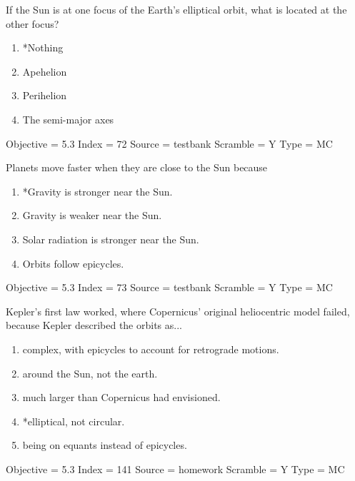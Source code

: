 \documentclass[11pt]{article}
\begin{document}
\begin{enumerate}
\begin{minipage}{\textwidth}
\begin{minipage}{\textwidth}
\item If the Sun is at one focus of the Earth’s elliptical orbit, what is located at the other focus?
\begin{multicols}{3}
\begin{enumerate} 
\setlength{\itemsep}{1pt} 
\setlength{\parskip}{0pt} 
\setlength{\parsep}{0pt}
\setlength{\multicolsep}{1pt} 
\item *Nothing
\item Apehelion
\item Perihelion
\item The semi-major axes
\end{enumerate} 
\vfill 
\end{multicols}

Objective = 5.3
Index = 72
Source = testbank
Scramble = Y
Type = MC
\end{minipage}
\end{minipage}
\vskip 0.20in

\begin{minipage}{\textwidth}
\begin{minipage}{\textwidth}
\item Planets move faster when they are close to the Sun because
\begin{enumerate} 
\setlength{\itemsep}{1pt} 
\setlength{\parskip}{0pt} 
\setlength{\parsep}{0pt}
\setlength{\multicolsep}{1pt} 
\item *Gravity is stronger near the Sun.
\item Gravity is weaker near the Sun.
\item Solar radiation is stronger near the Sun.
\item Orbits follow epicycles.
\end{enumerate} 
Objective = 5.3
Index = 73
Source = testbank
Scramble = Y
Type = MC
\end{minipage}
\end{minipage}
\vskip 0.20in

\begin{minipage}{\textwidth}
\begin{minipage}{\textwidth}
\item Kepler's first law worked, where Copernicus' original heliocentric model failed, because Kepler described the orbits as...
\begin{enumerate} 
\setlength{\itemsep}{1pt} 
\setlength{\parskip}{0pt} 
\setlength{\parsep}{0pt}
\setlength{\multicolsep}{1pt} 
\item complex, with epicycles to account for retrograde motions.
\item around the Sun, not the earth.
\item much larger than Copernicus had envisioned.
\item *elliptical, not circular.
\item being on equants instead of epicycles.
\end{enumerate} 
Objective = 5.3
Index = 141
Source = homework
Scramble = Y
Type = MC
\end{minipage}
\end{minipage}
\vskip 0.20in


\end{enumerate}
\end{document}
